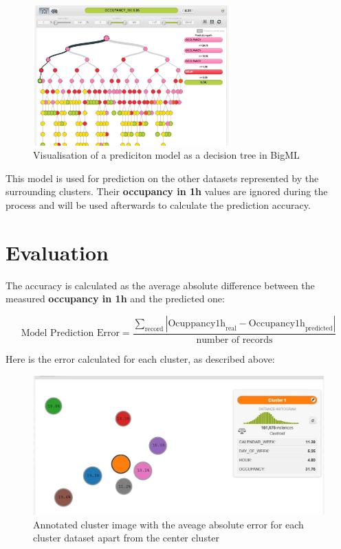\documentclass{article}
\begin{document}
\begin{figure}[!ht]
    \centering
    \includegraphics[width=3.0in]{bigml_decisiontree.jpg}
    \caption{Visualisation of a prediciton model as a decision tree in BigML}
    \label{fig:bigml_decisiontree}
\end{figure}

This model is used for prediction on the other datasets represented by the surrounding clusters. Their \textbf{occupancy in 1h} values are ignored during the process and will be used afterwards to calculate the prediction accuracy. 
\vspace{2mm}

\section{Evaluation}
\label{sec:Evaluation}
The accuracy is calculated as the average absolute difference between the measured \textbf{occupancy in 1h} and the predicted one:
\vspace{2mm}

$$
\text{Model Prediction Error} = \frac{\sum_{\text{record}}|\text{Ocuppancy1h}_\text{real} - \text{Occupancy1h}_\text{predicted}|}{\text{number of records}}
$$

Here is the error calculated for each cluster, as described above:
\vspace{2mm}

\begin{figure}[!ht]
    \centering
    \includegraphics[width=5.0in]{cluster_errors.jpg}
    \caption{Annotated cluster image with the aveage absolute error for each cluster dataset apart from the center cluster}
    \label{fig:cluster_errors}
\end{figure}
\end{document}
